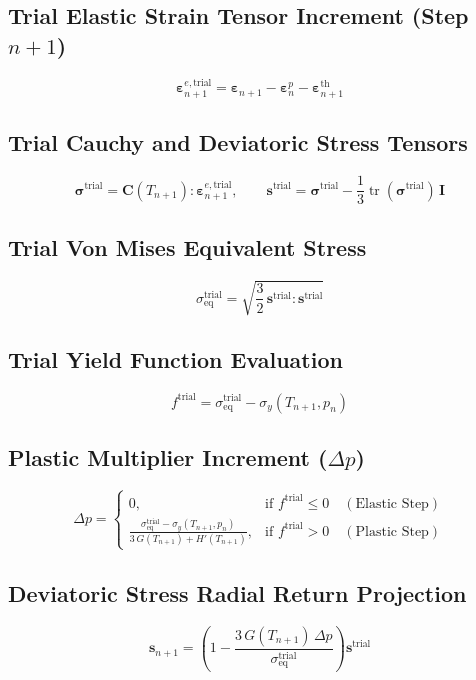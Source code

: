 \documentclass[10pt,a4paper]{article}
\begin{document}
\subsection*{Trial Elastic Strain Tensor Increment (Step $n+1$)}
\[
\boldsymbol{\varepsilon}^{e,\mathrm{trial}}_{n+1} = \boldsymbol{\varepsilon}_{n+1} - \boldsymbol{\varepsilon}^p_n - \boldsymbol{\varepsilon}^{\mathrm{th}}_{n+1}
\]

\subsection*{Trial Cauchy and Deviatoric Stress Tensors}
\[
\boldsymbol{\sigma}^{\mathrm{trial}} = \mathbf{C}(T_{n+1}) : \boldsymbol{\varepsilon}^{e,\mathrm{trial}}_{n+1}, \qquad \mathbf{s}^{\mathrm{trial}} = \boldsymbol{\sigma}^{\mathrm{trial}} - \frac{1}{3}\operatorname{tr}(\boldsymbol{\sigma}^{\mathrm{trial}})\,\mathbf{I}
\]

\subsection*{Trial Von Mises Equivalent Stress}
\[
\sigma_{\mathrm{eq}}^{\mathrm{trial}} = \sqrt{\frac{3}{2}\,\mathbf{s}^{\mathrm{trial}} : \mathbf{s}^{\mathrm{trial}}}
\]

\subsection*{Trial Yield Function Evaluation}
\[
f^{\mathrm{trial}} = \sigma_{\mathrm{eq}}^{\mathrm{trial}} - \sigma_y(T_{n+1}, p_n)
\]

\subsection*{Plastic Multiplier Increment ($\Delta p$)}
\[
\Delta p = \begin{cases}
0, & \text{if } f^{\mathrm{trial}} \le 0 \quad (\text{Elastic Step}) \\[6pt]
\displaystyle\frac{\sigma_{\mathrm{eq}}^{\mathrm{trial}} - \sigma_y(T_{n+1}, p_n)}{3\,G(T_{n+1}) + H'(T_{n+1})}, & \text{if } f^{\mathrm{trial}} > 0 \quad (\text{Plastic Step})
\end{cases}
\]

\subsection*{Deviatoric Stress Radial Return Projection}
\[
\mathbf{s}_{n+1} = \left( 1 - \frac{3\,G(T_{n+1})\,\Delta p}{\sigma_{\mathrm{eq}}^{\mathrm{trial}}} \right)\mathbf{s}^{\mathrm{trial}}
\]
\end{document}
